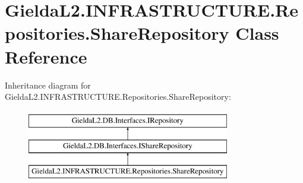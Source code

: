 \hypertarget{class_gielda_l2_1_1_i_n_f_r_a_s_t_r_u_c_t_u_r_e_1_1_repositories_1_1_share_repository}{}\section{Gielda\+L2.\+I\+N\+F\+R\+A\+S\+T\+R\+U\+C\+T\+U\+R\+E.\+Repositories.\+Share\+Repository Class Reference}
\label{class_gielda_l2_1_1_i_n_f_r_a_s_t_r_u_c_t_u_r_e_1_1_repositories_1_1_share_repository}
Inheritance diagram for Gielda\+L2.\+I\+N\+F\+R\+A\+S\+T\+R\+U\+C\+T\+U\+R\+E.\+Repositories.\+Share\+Repository\+:\begin{figure}[H]
\begin{center}
\leavevmode
\includegraphics[height=3.000000cm]{class_gielda_l2_1_1_i_n_f_r_a_s_t_r_u_c_t_u_r_e_1_1_repositories_1_1_share_repository}
\end{center}
\end{figure}
